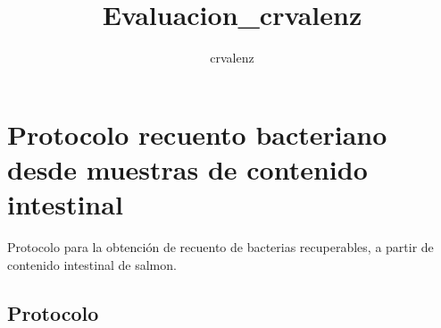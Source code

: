 \documentclass[
  letterpaper,
  DIV=11,
  numbers=noendperiod]{scrartcl}
\title{Evaluacion\_crvalenz}
\author{crvalenz}
\date{}
\begin{document}
\maketitle
\ifdefined\Shaded\renewenvironment{Shaded}{\begin{tcolorbox}[boxrule=0pt, sharp corners, interior hidden, borderline west={3pt}{0pt}{shadecolor}, enhanced, frame hidden, breakable]}{\end{tcolorbox}}\fi

\hypertarget{protocolo-recuento-bacteriano-desde-muestras-de-contenido-intestinal}{%
\section{Protocolo recuento bacteriano desde muestras de contenido
intestinal}\label{protocolo-recuento-bacteriano-desde-muestras-de-contenido-intestinal}}

Protocolo para la obtención de recuento de bacterias recuperables, a
partir de contenido intestinal de salmon.

\hypertarget{protocolo}{%
\subsection{Protocolo}\label{protocolo}}
\end{document}
